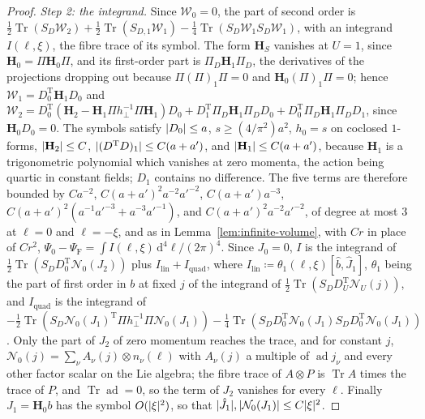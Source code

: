 \documentclass[11pt]{preprint}
\newcommand{\dd}{\mathrm{d}}
\DeclarePairedDelimiter{\abs}{\lvert}{\rvert}
\numberwithin{equation}{section}
\theoremstyle{definition}
\theoremstyle{remark}
\theoremstyle{plain}
\begin{document}
\begin{proof}
\emph{Step 2: the integrand.} Since $\mathcal W_0 = 0$, the part of second order is $\frac12\operatorname{Tr}(S_D\mathcal W_2) + \frac12\operatorname{Tr}(S_{D,1}\mathcal W_1) - \frac14\operatorname{Tr}(S_D\mathcal W_1S_D\mathcal W_1)$, with an integrand $I(\ell, \xi)$, the fibre trace of its symbol. The form $\mathbf H_S$ vanishes at $U = 1$, since $\mathbf H_0 = \Pi\mathbf H_0\Pi$, and its first-order part is $\Pi_D\mathbf H_1\Pi_D$, the derivatives of the projections dropping out because $\Pi(\Pi)_1\Pi = 0$ and $\mathbf H_0(\Pi)_1\Pi = 0$; hence $\mathcal W_1 = D_0^{\mathrm T}\mathbf H_1D_0$ and $\mathcal W_2 = D_0^{\mathrm T}(\mathbf H_2 - \mathbf H_1\Pi h_\perp^{-1}\Pi\mathbf H_1)D_0 + D_1^{\mathrm T}\Pi_D\mathbf H_1\Pi_DD_0 + D_0^{\mathrm T}\Pi_D\mathbf H_1\Pi_DD_1$, since $\mathbf H_0D_0 = 0$. The symbols satisfy $\abs{D_0} \leq a$, $s \geq (4/\pi^2)a^2$, $h_0 = s$ on coclosed $1$-forms, $\abs{\mathbf H_2} \leq C$, $\abs{(D^{\mathrm T}D)_1} \leq C(a + a')$, and $\abs{\mathbf H_1} \leq C(a + a')$, because $\mathbf H_1$ is a trigonometric polynomial which vanishes at zero momenta, the action being quartic in constant fields; $D_1$ contains no difference. The five terms are therefore bounded by $Ca^{-2}$, $C(a + a')^2a^{-2}a'^{-2}$, $C(a + a')a^{-3}$, $C(a + a')^2(a^{-1}a'^{-3} + a^{-3}a'^{-1})$, and $C(a + a')^2a^{-2}a'^{-2}$, of degree at most $3$ at $\ell = 0$ and $\ell = -\xi$, and as in Lemma~\ref{lem:infinite-volume}, with $Cr$ in place of $Cr^2$, $\Psi_0 - \Psi_{\mathrm F} = \int I(\ell, \xi)\,\dd^4\ell/(2\pi)^4$. Since $J_0 = 0$, $I$ is the integrand of $\frac12\operatorname{Tr}(S_DD_0^{\mathrm T}\mathcal N_0(J_2))$ plus $I_{\mathrm{lin}} + I_{\mathrm{quad}}$, where $I_{\mathrm{lin}} \coloneqq \theta_1(\ell, \xi)[\hat b, \hat J_1]$, $\theta_1$ being the part of first order in $b$ at fixed $j$ of the integrand of $\frac12\operatorname{Tr}(S_DD_U^{\mathrm T}\mathcal N_U(j))$, and $I_{\mathrm{quad}}$ is the integrand of $-\frac12\operatorname{Tr}(S_D\mathcal N_0(J_1)^{\mathrm T}\Pi h_\perp^{-1}\Pi\mathcal N_0(J_1)) - \frac14\operatorname{Tr}(S_DD_0^{\mathrm T}\mathcal N_0(J_1)S_DD_0^{\mathrm T}\mathcal N_0(J_1))$. Only the part of $J_2$ of zero momentum reaches the trace, and for constant $j$, $\mathcal N_0(j) = \sum_\nu A_\nu(j) \otimes n_\nu(\ell)$ with $A_\nu(j)$ a multiple of $\operatorname{ad}j_\nu$ and every other factor scalar on the Lie algebra; the fibre trace of $A \otimes P$ is $\operatorname{Tr}A$ times the trace of $P$, and $\operatorname{Tr}\operatorname{ad} = 0$, so the term of $J_2$ vanishes for every $\ell$. Finally $J_1 = \mathbf H_0b$ has the symbol $O(\abs{\xi}^2)$, so that $\abs{\hat J_1}, \abs{\mathcal N_0(J_1)} \leq C\abs{\xi}^2$.


\end{proof}
\end{document}
